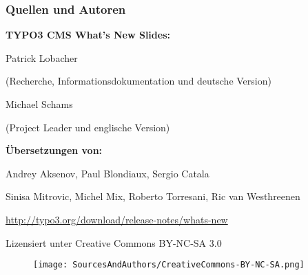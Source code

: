 \begin{frame}[fragile]
	\frametitle{Quellen und Autoren}

	\vspace{-0.6cm}

	\centerline{\textbf{TYPO3 CMS What's New Slides:}}

	\begin{center}
		\smaller
			\centerline{Patrick Lobacher}
			\centerline{(Recherche, Informationsdokumentation und deutsche Version)}
			\vspace{0.1cm}
			\centerline{Michael Schams}
			\centerline{(Project Leader und englische Version)}
		\normalsize
	\end{center}
	\vspace{-0.6cm}
	\begin{center}
		\smaller
			\centerline{\textbf{Übersetzungen von:}}
			\centerline{Andrey Aksenov, Paul Blondiaux, Sergio Catala}
			\centerline{Sinisa Mitrovic, Michel Mix, Roberto Torresani, Ric van Westhreenen}
		\normalsize
	\end{center}
	\vspace{-0.6cm}
	\smaller\begin{center}\url{http://typo3.org/download/release-notes/whats-new}\end{center}\normalsize

	\smaller\begin{center}Lizensiert unter Creative Commons BY-NC-SA 3.0\end{center}\normalsize
	\begin{figure}\vspace*{-0.3cm}
		\texttt{[image: SourcesAndAuthors/CreativeCommons-BY-NC-SA.png]}
	\end{figure}

\end{frame}

